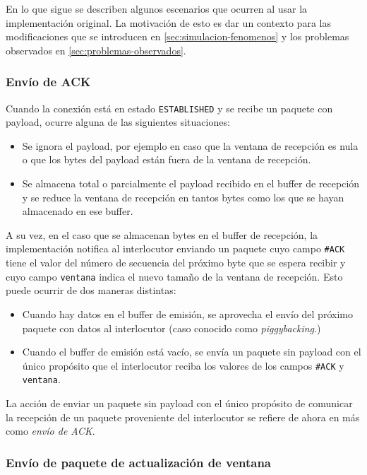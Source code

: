 \documentclass[a4paper, 10pt, twoside]{article}
\newcommand{\established}{\texttt{ESTABLISHED}\xspace}
\newcommand{\ack}{\texttt{\#ACK}\xspace}
\newcommand{\window}{\texttt{ventana}\xspace}
\begin{document}
En lo que sigue se describen algunos escenarios que ocurren al usar la implementación original. La motivación de esto es dar un contexto para las modificaciones que se introducen en \ref{sec:simulacion-fenomenos} y los problemas observados en \ref{sec:problemas-observados}.


\subsubsection{Envío de ACK}

Cuando la conexión está en estado \established y se recibe un paquete con payload, ocurre alguna de las siguientes situaciones:

\begin{itemize}
  \item Se ignora el payload, por ejemplo en caso que la ventana de recepción es nula o que los bytes del payload están fuera de la ventana de recepción.

  \item Se almacena total o parcialmente el payload recibido en el buffer de recepción y se reduce la ventana de recepción en tantos bytes como los que se hayan almacenado en ese buffer.
\end{itemize}

A su vez, en el caso que se almacenan bytes en el buffer de recepción, la implementación notifica al interlocutor enviando un paquete cuyo campo \ack tiene el valor del número de secuencia del próximo byte que se espera recibir y cuyo campo \window indica el nuevo tamaño de la ventana de recepción. Esto puede ocurrir de dos maneras distintas:

\begin{itemize}
  \item Cuando hay datos en el buffer de emisión, se aprovecha el envío del próximo paquete con datos al interlocutor (caso conocido como \emph{piggybacking}.)

  \item Cuando el buffer de emisión está vacío, se envía un paquete sin payload con el único propósito que el interlocutor reciba los valores de los campos \ack y \window.
\end{itemize}

La acción de enviar un paquete sin payload con el único propósito de comunicar la recepción de un paquete proveniente del interlocutor se refiere de ahora en más como \emph{envío de ACK}.


\subsubsection{Envío de paquete de actualización de ventana}
\end{document}
